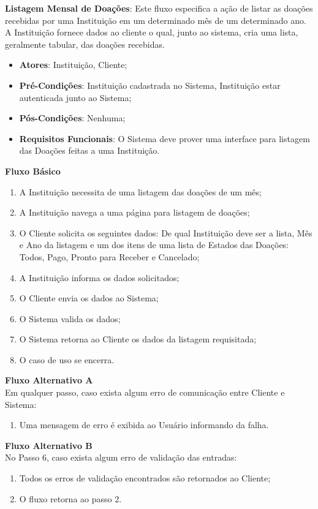 \begin{lista}
  \item \textbf{Listagem Mensal de Doações}: Este fluxo especifica a ação de listar as doações recebidas por uma Instituição em um determinado mês de um determinado ano. A Instituição fornece dados ao cliente o qual, junto ao sistema, cria uma lista, geralmente tabular, das doações recebidas.
    \begin{itemize}
    \item \textbf{Atores}: Instituição, Cliente;
    \item \textbf{Pré-Condições}: Instituição cadastrada no Sistema, Instituição estar autenticada junto ao Sistema;
    \item \textbf{Pós-Condições}: Nenhuma;
    \item \textbf{Requisitos Funcionais}: O Sistema deve prover uma interface para listagem das Doações feitas a uma Instituição.
    \end{itemize}
	
    \textbf{Fluxo Básico}
    \begin{enumerate}
    \item A Instituição necessita de uma listagem das doações de um mês;
    \item A Instituição navega a uma página para listagem de doações;
    \item O Cliente solicita os seguintes dados: De qual Instituição deve ser a lista, Mês e Ano da listagem e um dos itens de uma lista de Estados das Doações: Todos, Pago, Pronto para Receber e Cancelado;
    \item A Instituição informa os dados solicitados;
    \item O Cliente envia os dados ao Sistema;
    \item O Sistema valida os dados;
    \item O Sistema retorna ao Cliente os dados da listagem requisitada;
    \item O caso de uso se encerra.
    \end{enumerate}
    
    \textbf{Fluxo Alternativo A} \\
    Em qualquer passo, caso exista algum erro de comunicação entre Cliente e Sistema:
    \begin{enumerate}
    \item Uma mensagem de erro é exibida ao Usuário informando da falha.
    \end{enumerate}
    
    \textbf{Fluxo Alternativo B} \\
    No Passo 6, caso exista algum erro de validação das entradas:
    \begin{enumerate}
    \item Todos os erros de validação encontrados são retornados ao Cliente;
    \item O fluxo retorna ao passo 2.
    \end{enumerate}
  

\end{lista}
